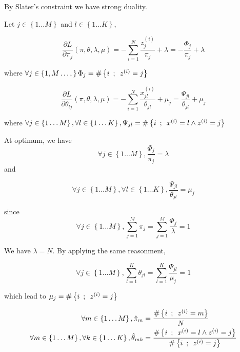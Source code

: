 \documentclass[a4paper, 11pt]{article}
\newcommand{\intn}[2]{\left\{ #1 \dots #2 \right\}}
\newcommand{\pd}[2]{\frac{\partial #1}{\partial #2}}
\newcommand{\set}[2]{\left\{ #1 \hspace{.5em} ; \hspace{.5em}#2 \right\}}
\begin{document}
By Slater's constraint we have strong duality.

Let $j \in \intn{1}{M}$ and $l \in \intn{1}{K}$,

\begin{equation*}
  \pd{L}{\pi_j}(\pi,\theta, \lambda, \mu) = - \sum_{i = 1}^N \frac{z^{(i)}_j}{\pi_j} + \lambda = - \frac{\Phi_j}{\pi_j} + \lambda
\end{equation*}

where $\forall j \in \intn{1, M}, \Phi_j = \#\set{i}{z^{(i)} = j}$

\begin{equation*}
  \pd{L}{\theta_{l j}}(\pi,\theta, \lambda, \mu) = - \sum_{i = 1}^N \frac{x^{(i)}_{j l}}{\theta_{j l}} + \mu_j = \frac{\Psi_{j l}}{\theta_{j l}} + \mu_j
\end{equation*}

where $\forall j \in \intn{1}{M}, \forall l \in \intn{1}{K}, \Psi_{j l} = \#\set{i}{x^{(i)} = l \land z^{(i)} = j}$

At optimum, we have
\begin{equation*}
  \forall j \in \intn{1}{M}, \frac{\Phi_j}{\pi_j} = \lambda
\end{equation*}
and

\begin{equation*}
  \forall j \in \intn{1}{M}, \forall l \in \intn{1}{K}, \frac{\Psi_{j l}}{\theta_{j l}} = \mu_j
\end{equation*}

since
\begin{equation*}
  \forall j \in \intn{1}{M}, \sum_{j = 1}^M \pi_j = \sum_{j = 1}^M \frac{\Phi_j}{\lambda} = 1
\end{equation*}

We have $\lambda = N$. By applying the same reasonment,

\begin{equation*}
  \forall j \in \intn{1}{M}, \sum_{l = 1}^K \theta_{j l} = \sum_{l = 1}^K \frac{\Psi_{j l}}{\mu_j} = 1
\end{equation*}

which lead to $\mu_j = \#\set{i}{z^{(i)} = j}$



\begin{framed}
  \begin{align*}
    \forall m \in \intn{1}{M}, \hat{\pi}_m & = \frac{\#\set{i}{z^{(i)} = m}}{N} \\
    \forall m \in \intn{1}{M}, \forall k \in \intn{1}{K}, \hat{\theta}_{m k} & = \frac{\#\set{i}{x^{(i)} = l \land z^{(i)} = j}}{\#\set{i}{z^{(i)} = j}}
  \end{align*}
\end{framed}
\end{document}
